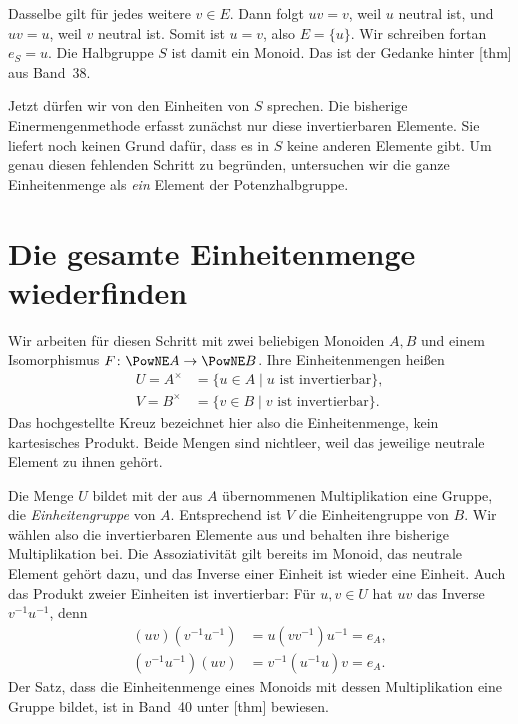 Dasselbe gilt für jedes weitere \(v\in E\). Dann folgt
\(uv=v\), weil \(u\) neutral ist, und \(uv=u\), weil \(v\)
neutral ist. Somit ist \(u=v\), also \(E=\{u\}\).
Wir schreiben fortan \(e_S=u\). Die Halbgruppe \(S\) ist
damit ein Monoid. Das ist der Gedanke hinter
[thm]
aus Band~38.

Jetzt dürfen wir von den Einheiten von \(S\) sprechen.
Die bisherige Einermengenmethode erfasst zunächst nur diese
invertierbaren Elemente. Sie liefert noch keinen Grund dafür,
dass es in \(S\) keine anderen Elemente gibt. Um genau diesen
fehlenden Schritt zu begründen, untersuchen wir die ganze
Einheitenmenge als \emph{ein} Element der Potenzhalbgruppe.

\par{}
\section*{Die gesamte Einheitenmenge wiederfinden}
\hypertarget{reconstruction.reading.unitset}{}

Wir arbeiten für diesen Schritt mit zwei beliebigen Monoiden
\(A,B\) und einem Isomorphismus
\(F\colon\PowNE A\to\PowNE B\). Ihre Einheitenmengen heißen
\[
  \begin{aligned}
    U=A^\times&=\{u\in A\mid u\text{ ist invertierbar}\},\\
    V=B^\times&=\{v\in B\mid v\text{ ist invertierbar}\}.
  \end{aligned}
\]
Das hochgestellte Kreuz bezeichnet hier also die Einheitenmenge,
kein kartesisches Produkt. Beide Mengen sind nichtleer, weil
das jeweilige neutrale Element zu ihnen gehört.

Die Menge \(U\) bildet mit der aus \(A\) übernommenen
Multiplikation eine Gruppe, die \emph{Einheitengruppe} von
\(A\). Entsprechend ist \(V\) die Einheitengruppe von \(B\).
Wir wählen also die invertierbaren Elemente aus und behalten
ihre bisherige Multiplikation bei. Die
Assoziativität gilt bereits im Monoid, das neutrale Element
gehört dazu, und das Inverse einer Einheit ist wieder eine
Einheit. Auch das Produkt zweier Einheiten ist invertierbar:
Für \(u,v\in U\) hat \(uv\) das Inverse \(v^{-1}u^{-1}\),
denn
\[
  \begin{aligned}
    (uv)(v^{-1}u^{-1})&=u(vv^{-1})u^{-1}=e_A,\\
    (v^{-1}u^{-1})(uv)&=v^{-1}(u^{-1}u)v=e_A.
  \end{aligned}
\]
Der Satz, dass die Einheitenmenge eines Monoids mit dessen
Multiplikation eine Gruppe bildet, ist in Band~40 unter
[thm] bewiesen.

